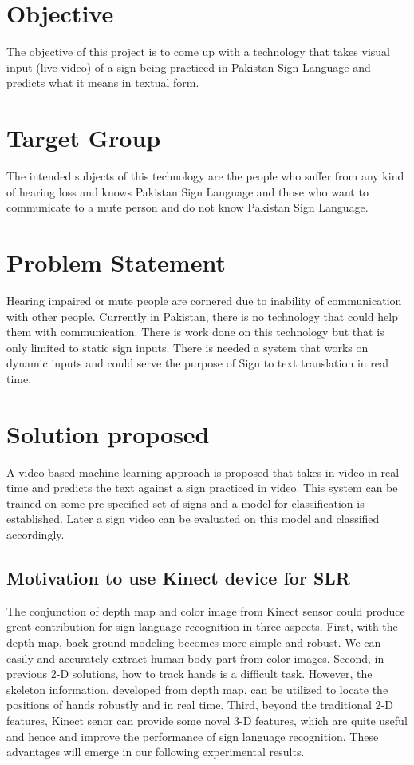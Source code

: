 \section{ Objective}
The objective of this project is to come up with a technology that takes visual input (live video) of a sign being practiced in Pakistan Sign Language and predicts what it means in textual form.


\section{ Target Group}
The intended subjects of this technology are the people who suffer from any kind of hearing loss and knows Pakistan Sign Language and those who want to communicate to a mute person and do not know Pakistan Sign Language.

\section{ Problem Statement}
Hearing impaired or mute people are cornered due to inability of communication with other people. Currently in Pakistan, there is no technology that could help them with communication. There is work done on this technology but that is only limited to static sign inputs. There is needed a system that works on dynamic inputs and could serve the purpose of Sign to text translation in real time.

\section{Solution proposed}
A video based machine learning approach is proposed that takes in video in real time and predicts the text against a sign practiced in video. This system can be trained on some pre-specified set of signs and a model for classification is established. Later a sign video can be evaluated on this model and classified accordingly.
\subsection{Motivation to use Kinect device for SLR}
The conjunction of depth map and color image from Kinect sensor could produce great contribution for sign language recognition in three aspects. First, with the depth map, back-ground modeling becomes more simple and robust. We can easily and accurately extract human body part from color images. Second, in previous 2-D solutions, how to track hands is a difficult task. However, the skeleton information, developed from depth map, can be utilized to locate the positions of hands robustly and in real time. Third, beyond the traditional 2-D features, Kinect senor can provide some novel 3-D features, which are quite useful and hence and improve the performance of sign language recognition. These advantages will emerge in our following experimental results.

